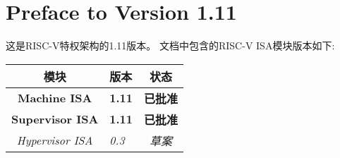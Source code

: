 \section*{Preface to Version 1.11}

这是RISC-V特权架构的1.11版本。
文档中包含的RISC-V ISA模块版本如下:
{
\begin{table}[hbt]
  \centering
  \begin{tabular}{|c|l|c|}
    \hline
    模块             & 版本  & 状态 \\
    \hline
    \bf Machine ISA    & \bf 1.11 & \bf 已批准 \\
    \bf Supervisor ISA & \bf 1.11 & \bf 已批准 \\
    \em Hypervisor ISA & \em 0.3  & \em 草案 \\
    \hline
  \end{tabular}
\end{table}
}

